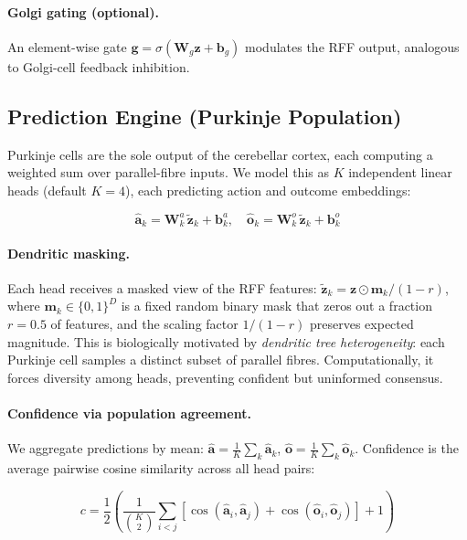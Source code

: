 \documentclass[11pt,a4paper]{article}
\DeclareMathOperator{\cosim}{cos}
\begin{document}
\paragraph{Golgi gating (optional).}
An element-wise gate $\mathbf{g} = \sigma(\mathbf{W}_g \mathbf{z} + \mathbf{b}_g)$ modulates the RFF output, analogous to Golgi-cell feedback inhibition.

\subsection{Prediction Engine (Purkinje Population)}\label{sec:pred_engine}

Purkinje cells are the sole output of the cerebellar cortex, each computing a weighted sum over parallel-fibre inputs.
We model this as $K$ independent linear heads (default $K=4$), each predicting action and outcome embeddings:

\begin{equation}
  \hat{\mathbf{a}}_k = \mathbf{W}_k^a \, \tilde{\mathbf{z}}_k + \mathbf{b}_k^a, \quad
  \hat{\mathbf{o}}_k = \mathbf{W}_k^o \, \tilde{\mathbf{z}}_k + \mathbf{b}_k^o
\end{equation}

\paragraph{Dendritic masking.}
Each head receives a masked view of the RFF features:
$\tilde{\mathbf{z}}_k = \mathbf{z} \odot \mathbf{m}_k / (1 - r)$,
where $\mathbf{m}_k \in \{0,1\}^D$ is a fixed random binary mask that zeros out a fraction $r=0.5$ of features, and the scaling factor $1/(1-r)$ preserves expected magnitude.
This is biologically motivated by \emph{dendritic tree heterogeneity}: each Purkinje cell samples a distinct subset of parallel fibres.
Computationally, it forces diversity among heads, preventing confident but uninformed consensus.

\paragraph{Confidence via population agreement.}
We aggregate predictions by mean:
$\hat{\mathbf{a}} = \frac{1}{K}\sum_k \hat{\mathbf{a}}_k$, $\hat{\mathbf{o}} = \frac{1}{K}\sum_k \hat{\mathbf{o}}_k$.
Confidence is the average pairwise cosine similarity across all head pairs:

\begin{equation}\label{eq:confidence}
  c = \frac{1}{2} \left( \frac{1}{\binom{K}{2}} \sum_{i<j} \left[
    \cosim(\hat{\mathbf{a}}_i, \hat{\mathbf{a}}_j) +
    \cosim(\hat{\mathbf{o}}_i, \hat{\mathbf{o}}_j)
  \right] + 1 \right)
\end{equation}
\end{document}
